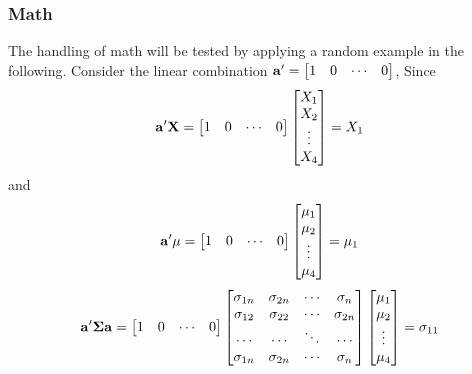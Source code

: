 \subsubsection{Math}
\label{sec:math}
The handling of math will be tested by applying a random example in the following.
Consider the linear combination $\mathbf a'=\begin{bmatrix} 1 & 0 & \cdots & 0 \end{bmatrix}$, Since
\begin{equation}
    \mathbf a'\mathbf X = \begin{bmatrix} 1 & 0 & \cdots & 0 \end{bmatrix}\begin{bmatrix} X_1 \\ X_2  \\ \vdots \\ X_4\end{bmatrix} = X_1
\end{equation}
and
\begin{equation}
    \mathbf a'\mathbf{\mu} = \begin{bmatrix} 1 & 0 & \cdots & 0 \end{bmatrix}\begin{bmatrix} \mu_1 \\ \mu_2  \\ \vdots \\ \mu_4\end{bmatrix} = \mu_1
\end{equation}
\begin{equation}
    \mathbf a'\mathbf{\Sigma}\mathbf a = \begin{bmatrix} 1 & 0 & \cdots & 0 \end{bmatrix}
    \begin{bmatrix}
        \sigma_{1n} & \sigma_{2n} & \cdots & \sigma_{n} \\
        \sigma_{12} & \sigma_{22} & \cdots & \sigma_{2n} \\
        \cdots & \cdots & \ddots & \cdots \\
        \sigma_{1n} & \sigma_{2n} & \cdots & \sigma_{n} \\
    \end{bmatrix}
    \begin{bmatrix} \mu_1 \\ \mu_2  \\ \vdots \\ \mu_4\end{bmatrix} = \sigma_{11}
\end{equation}











% 
